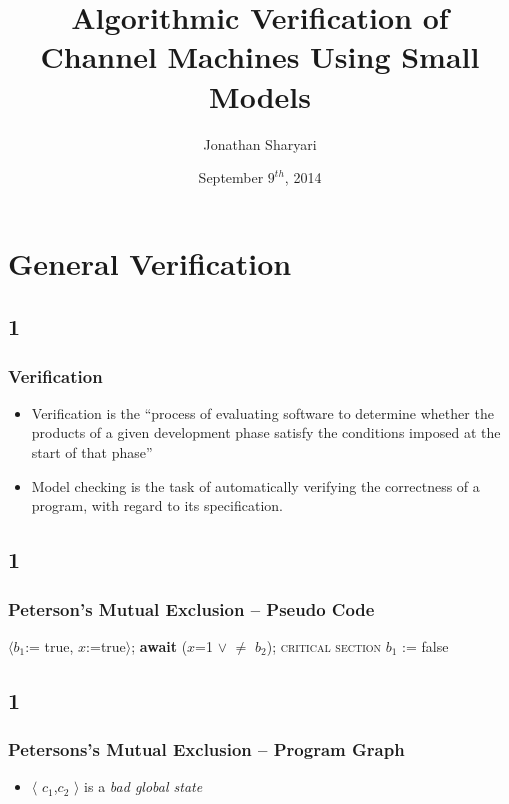 \documentclass[handout]{beamer}
\title[] %
{Algorithmic Verification of Channel Machines Using Small Models}
\author[J, Sharyari | \emph{sharyari@gmail.com}] {Jonathan Sharyari}
\date[2014-09-09] %
{September $9^{th}$, 2014}
\institute[Dept. of Information Technology] %
{
  Department of Information Technology\\
  Uppsala University \\ \vspace{10pt}
  Supervisor: Parosh Abdulla \\
  Reviewer: Mohamed Faouzi Atig
}
\begin{document}
\begin{frame}[plain]
  \titlepage
\end{frame}

\begin{frame}
  \tableofcontents

\end{frame}

\section{General Verification}
\subsection*{1}
\begin{frame}
  \frametitle{Verification}
  \begin{itemize}
  \item
    Verification is the “process of evaluating software to determine whether the products of a given development phase satisfy the conditions imposed at the start of that phase”\cite{ordbok}
  \item
    Model checking is the task of automatically verifying the correctness of a program, with regard to its specification.
  \end{itemize}
\end{frame}

\subsection*{1}
\begin{frame}
  \frametitle{Peterson's Mutual Exclusion -- Pseudo Code}

  \begin{algorithmic}
    \small
    \State $\langle b_1$:= true, $x$:=true$\rangle$;
    \State \textbf{await} ($x$=1 $\vee$ $\neq$ $b_2$);
    \State \textsc{critical section}
    \State $b_1$ := false
    \EndWhile
  \end{algorithmic}


\end{frame}

\subsection*{1}
\begin{frame}
  \begin{example}
    \frametitle{Petersons's Mutual Exclusion -- Program Graph}
    \petersonone

    \petersontwo
  \end{example}
  \begin{itemize}
  \item
    $\langle$ $c_1$,$c_2$ $\rangle$ is a \emph{bad global state}
  \end{itemize}

\end{frame}
\end{document}
